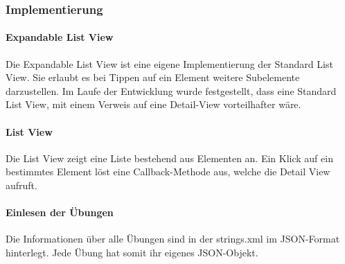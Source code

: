 \documentclass[FIPLY_base.tex]{subfiles}
\begin{document}
\subsubsection{Implementierung}
\paragraph{Expandable List View}
Die Expandable List View ist eine eigene Implementierung der Standard List View. Sie erlaubt es bei Tippen auf ein Element weitere Subelemente darzustellen.
Im Laufe der Entwicklung wurde festgestellt, dass eine Standard List View, mit einem Verweis auf eine Detail-View vorteilhafter wäre.

\paragraph{List View}
Die List View zeigt eine Liste bestehend aus Elementen an. Ein Klick auf ein bestimmtes Element löst eine Callback-Methode aus, welche die Detail View aufruft.
\newpage
\paragraph{Einlesen der Übungen}
Die Informationen über alle Übungen sind in der strings.xml im JSON-Format hinterlegt.
Jede Übung hat somit ihr eigenes JSON-Objekt. 
\end{document}
